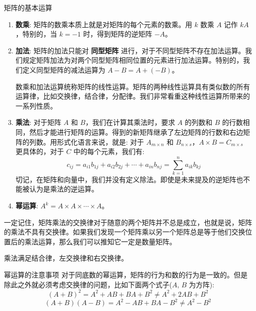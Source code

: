 \documentclass[a4paper,12pt]{ctexart}
\begin{document}
\begin{mydef}{矩阵的基本运算}{}
\begin{enumerate}
    \item \textbf{数乘}: 矩阵的数乘本质上就是对矩阵的每个元素的数乘。用 $k$ 数乘 $A$ 记作 $kA$，特别的，当 $k=-1$ 时，得到矩阵的逆矩阵 $-A$。
    
    \item \textbf{加法}: 矩阵的加法只能对 \textbf{同型矩阵} 进行，对于不同型矩阵不存在加法运算。我们规定矩阵加法为对两个同型矩阵相同位置的元素进行加法运算。特别的，我们定义同型矩阵的减法运算为 $A-B=A+(-B)$。
    
    数乘和加法运算统称矩阵的线性运算。矩阵的两种线性运算具有类似数的所有运算律，比如交换律，结合律，分配律。我们非常看重这种线性运算所带来的一系列性质。
    
    \item \textbf{乘法}: 对于矩阵 $A$ 和 $B$，我们在计算其乘法时，要求 $A$ 的列数和 $B$ 的行数相同，然后才能进行矩阵的运算。得到的新矩阵继承了左边矩阵的行数和右边矩阵的列数。用形式化语言来说，就是: 对于 $A_{m \times n}$ 和 $B_{n \times s}$，$A \times B = C_{m \times s}$ 更具体的，对于 $C$ 中的每个元素，我们有:
    \[
    c_{ij} = a_{i1}b_{1j}+a_{i2}b_{2j}+ \cdots +a_{in}b_{nj} = \sum_{k=1}^{n} a_{ik}b_{kj}
    \]
    切记，在矩阵和向量中，我们并没有定义除法。即使是未来提及的逆矩阵也不能被认为是乘法的逆运算。
    
    \item \textbf{幂运算}: $A^k = A \times A \times \cdots \times A$。
\end{enumerate}
\end{mydef}

\begin{mynote}
    一定记住，矩阵乘法的交换律对于随意的两个矩阵并不总是成立，也就是说，矩阵的乘法不具有交换律。如果我们发现一个矩阵乘以另一个矩阵总是等于他们交换位置后的乘法运算，那么我们可以推知它一定是数量矩阵。
    
    乘法满足结合律，左交换律和右交换律。
\end{mynote}

\newpage

\begin{myprop}{幂运算的注意事项}{}
    对于同底数的幂运算，矩阵的行为和数的行为是一致的。但是除此之外就必须考虑交换律的问题，比如下面两个式子($A$, $B$ 为方阵):
    \[
    (A+B)^2 = A^2 + AB + BA + B^2 \neq A^2 +2AB + B^2
    \]
    \[
    (A+B)(A-B) = A^2 - AB + BA - B^2 \neq A^2 - B^2
    \]
\end{myprop}
\end{document}

